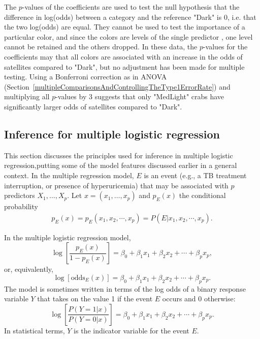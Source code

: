 The $p$-values of the coefficients are used to test the null hypothesis that the difference in log(odds) between a category and the reference "Dark" is 0, i.e. that the two log(odds) are equal.  They cannot be used to test the importance of a particular color, and since the colors are levels of the single predictor , one level cannot be retained and the others dropped.  In these data, the $p$-values for the coefficients may that all colors are associated with an increase in the odds of satellites compared to "Dark", but no adjustment has been made for multiple testing.  Using a Bonferroni correction as in ANOVA (Section~\ref{multipleComparisonsAndControllingTheType1ErrorRate}) and multiplying all $p$-values by 3 suggests that only "MedLight" crabs have significantly larger odds of satellites compared to "Dark".





\subsection{Inference for multiple logistic regression}
\label{inferenceMultipleLogisticRegression}

This section discusses the principles used for inference in multiple logistic regression,putting some of the model features discussed earlier in a general context. In the multiple regression model, $E$ is an event (e.g., a TB treatment interruption, or presence of hyperuricemia) that may be associated with $p$ predictors $X_1, \ldots, X_p$. Let $x = (x_1,\ldots,x_p)$ and $p_E(x)$ the conditional probability
\begin{align*}
  p_E(x) = p_E(x_1, x_2,\cdots, x_p) = P(E| x_1, x_2,\cdots,x_p).
\end{align*}

In the multiple logistic regression model,
\[
 \log\left[\frac{p_E(x)}{1 - p_E(x)}\right] = \beta_0 + \beta_1 x_1 +
      \beta_2 x_2 + \cdots + \beta_p x_p,
\]
or, equivalently,
\[
  \log\left[\text{odds}_E(x)\right] = \beta_0 + \beta_1 x_1 +
      \beta_2 x_2 + \cdots + \beta_p x_p.
\]
The model is sometimes written in terms of the log odds of a binary response variable $Y$ that takes on the value 1 if the event $E$ occurs and 0 otherwise:
\[
  \log\left[\frac{P(Y = 1|x)}{P(Y = 0|x)}\right] = \beta_0 + \beta_1 x_1 +
      \beta_2 x_2 + \cdots + \beta_p x_p.
\]
In statistical terms, $Y$ is the indicator variable for the event $E$.

